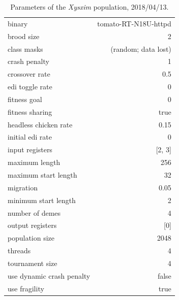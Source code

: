 \documentclass[12pt,glossary]{dalthesis}
\begin{document}
\begin{table}[htbp]
\caption{Parameters of the \emph{Xysxim} population, 2018/04/13.}
\centering
\begin{tabular}{lr}
binary & tomato-RT-N18U-httpd\\
brood size & 2\\
class masks & (random; data lost)\\
crash penalty & 1\\
crossover rate & 0.5\\
edi toggle rate & 0\\
fitness goal & 0\\
fitness sharing & true\\
headless chicken rate & 0.15\\
initial edi rate & 0\\
input registers & [2, 3]\\
maximum length & 256\\
maximum start length & 32\\
migration & 0.05\\
minimum start length & 2\\
number of demes & 4\\
output registers & [0]\\
population size & 2048\\
threads & 4\\
tournament size & 4\\
use dynamic crash penalty & false\\
use fragility & true\\
\end{tabular}
\end{table}




\end{document}

